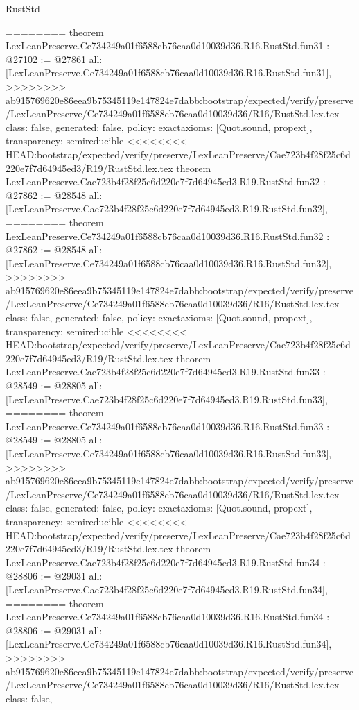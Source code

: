 \begin{lexlean}{RustStd}
\begin{coremodule}
{\begin{coremodule}
{{{{{{{{{{{{{{{{{{{{{{{{{{{{{{{{{{========
theorem LexLeanPreserve.Ce734249a01f6588cb76caa0d10039d36.R16.RustStd.fun31 : @27102 := @27861 {
  all: [LexLeanPreserve.Ce734249a01f6588cb76caa0d10039d36.R16.RustStd.fun31],
>>>>>>>> ab915769620e86eea9b75345119e147824e7dabb:bootstrap/expected/verify/preserve/LexLeanPreserve/Ce734249a01f6588cb76caa0d10039d36/R16/RustStd.lex.tex
  class: false,
  generated: false,
  policy: exact{axioms: [Quot.sound, propext]},
  transparency: semireducible
}
<<<<<<<< HEAD:bootstrap/expected/verify/preserve/LexLeanPreserve/Cae723b4f28f25c6d220e7f7d64945ed3/R19/RustStd.lex.tex
theorem LexLeanPreserve.Cae723b4f28f25c6d220e7f7d64945ed3.R19.RustStd.fun32 : @27862 := @28548 {
  all: [LexLeanPreserve.Cae723b4f28f25c6d220e7f7d64945ed3.R19.RustStd.fun32],
========
theorem LexLeanPreserve.Ce734249a01f6588cb76caa0d10039d36.R16.RustStd.fun32 : @27862 := @28548 {
  all: [LexLeanPreserve.Ce734249a01f6588cb76caa0d10039d36.R16.RustStd.fun32],
>>>>>>>> ab915769620e86eea9b75345119e147824e7dabb:bootstrap/expected/verify/preserve/LexLeanPreserve/Ce734249a01f6588cb76caa0d10039d36/R16/RustStd.lex.tex
  class: false,
  generated: false,
  policy: exact{axioms: [Quot.sound, propext]},
  transparency: semireducible
}
<<<<<<<< HEAD:bootstrap/expected/verify/preserve/LexLeanPreserve/Cae723b4f28f25c6d220e7f7d64945ed3/R19/RustStd.lex.tex
theorem LexLeanPreserve.Cae723b4f28f25c6d220e7f7d64945ed3.R19.RustStd.fun33 : @28549 := @28805 {
  all: [LexLeanPreserve.Cae723b4f28f25c6d220e7f7d64945ed3.R19.RustStd.fun33],
========
theorem LexLeanPreserve.Ce734249a01f6588cb76caa0d10039d36.R16.RustStd.fun33 : @28549 := @28805 {
  all: [LexLeanPreserve.Ce734249a01f6588cb76caa0d10039d36.R16.RustStd.fun33],
>>>>>>>> ab915769620e86eea9b75345119e147824e7dabb:bootstrap/expected/verify/preserve/LexLeanPreserve/Ce734249a01f6588cb76caa0d10039d36/R16/RustStd.lex.tex
  class: false,
  generated: false,
  policy: exact{axioms: [Quot.sound, propext]},
  transparency: semireducible
}
<<<<<<<< HEAD:bootstrap/expected/verify/preserve/LexLeanPreserve/Cae723b4f28f25c6d220e7f7d64945ed3/R19/RustStd.lex.tex
theorem LexLeanPreserve.Cae723b4f28f25c6d220e7f7d64945ed3.R19.RustStd.fun34 : @28806 := @29031 {
  all: [LexLeanPreserve.Cae723b4f28f25c6d220e7f7d64945ed3.R19.RustStd.fun34],
========
theorem LexLeanPreserve.Ce734249a01f6588cb76caa0d10039d36.R16.RustStd.fun34 : @28806 := @29031 {
  all: [LexLeanPreserve.Ce734249a01f6588cb76caa0d10039d36.R16.RustStd.fun34],
>>>>>>>> ab915769620e86eea9b75345119e147824e7dabb:bootstrap/expected/verify/preserve/LexLeanPreserve/Ce734249a01f6588cb76caa0d10039d36/R16/RustStd.lex.tex
  class: false,
}}}}}}}}}}}}}}}}}}}}}}}}}}}}}}}}}}}}}}
\end{coremodule}}
\end{coremodule}
\end{lexlean}
